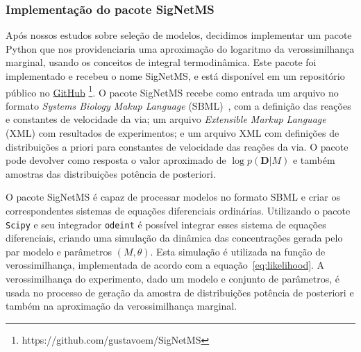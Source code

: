 \documentclass[12pt]{article}
\newcommand{\algname}[1]{\texttt{#1}}
\begin{document}
\subsubsection{Implementação do pacote SigNetMS}
Após nossos estudos sobre seleção de modelos, decidimos implementar
um pacote Python que nos providenciaria uma aproximação do logaritmo da
verossimilhança marginal, usando os conceitos de integral termodinâmica.
Este pacote foi implementado e recebeu o nome SigNetMS, e está 
disponível em um repositório público no
\href{https://github.com/gustavoem/SigNetMS}{GitHub}
\footnote{https://github.com/gustavoem/SigNetMS}. O pacote SigNetMS 
recebe como entrada um arquivo no formato \emph{Systems Biology Makup
Language} (SBML)~\cite{Hucka2003}, com a definição das reações e 
constantes de velocidade da via; um arquivo \emph{Extensible Markup 
Language} (XML) com resultados de experimentos; e um arquivo XML com 
definições de distribuições a priori para constantes de velocidade das
reações da via. O pacote pode devolver como resposta o valor aproximado
de $\log p (\mathbf{D} | M)$ e também amostras das distribuições
potência de posteriori.

O pacote SigNetMS é capaz de processar modelos no formato SBML e criar
os correspondentes sistemas de equações diferenciais ordinárias.
Utilizando o pacote \algname{Scipy} e seu integrador \algname{odeint} é
possível integrar esses sistema de equações diferenciais, criando uma
simulação da dinâmica das concentrações gerada pelo par modelo e 
parâmetros $(M, \theta)$. Esta simulação é utilizada na função de 
verossimilhança, implementada de acordo com a 
equação~\ref{eq:likelihood}. A verossimilhança do experimento, dado um
modelo e conjunto de parâmetros, é usada no processo de geração da
amostra de distribuições potência de posteriori e também na aproximação 
da verossimilhança marginal.
\end{document}
